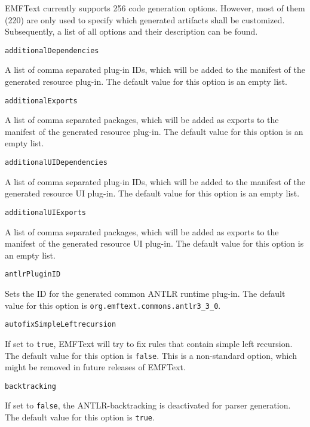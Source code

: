 EMFText currently supports 256 code generation options. However, most of them (220) are only used to specify which generated artifacts shall be customized. Subsequently, a list of all options and their description can be found.

\vspace{1cm}\noindent\texttt{additionalDependencies}
\begin{myindentpar}{1cm}
A list of comma separated plug-in IDs, which will be added to the manifest of the generated resource plug-in. The default value for this option is an empty list.
\end{myindentpar}

\noindent\texttt{additionalExports}
\begin{myindentpar}{1cm}
A list of comma separated packages, which will be added as exports to the manifest of the generated resource plug-in. The default value for this option is an empty list.
\end{myindentpar}

\noindent\texttt{additionalUIDependencies}
\begin{myindentpar}{1cm}
A list of comma separated plug-in IDs, which will be added to the manifest of the generated resource UI plug-in. The default value for this option is an empty list.
\end{myindentpar}

\noindent\texttt{additionalUIExports}
\begin{myindentpar}{1cm}
A list of comma separated packages, which will be added as exports to the manifest of the generated resource UI plug-in. The default value for this option is an empty list.
\end{myindentpar}

\noindent\texttt{antlrPluginID}
\begin{myindentpar}{1cm}
Sets the ID for the generated common ANTLR runtime plug-in. The default value for this option is \texttt{org.emftext.commons.antlr3\_3\_0}.
\end{myindentpar}

\noindent\texttt{autofixSimpleLeftrecursion}
\begin{myindentpar}{1cm}
If set to \texttt{true}, EMFText will try to fix rules that contain simple left recursion. The default value for this option is \texttt{false}. This is a non-standard option, which might be removed in future releases of EMFText.
\end{myindentpar}

\noindent\texttt{backtracking}
\begin{myindentpar}{1cm}
If set to \texttt{false}, the ANTLR-backtracking is deactivated for parser generation. The default value for this option is \texttt{true}.
\end{myindentpar}

